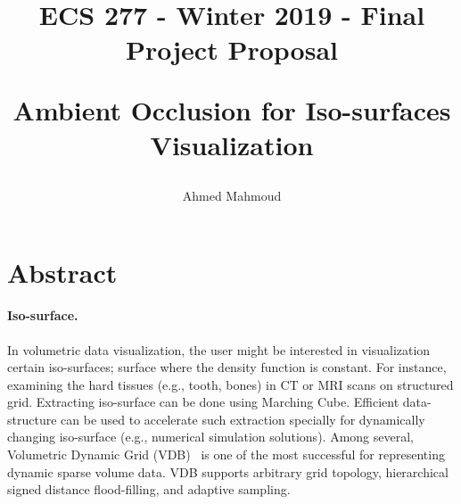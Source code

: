 \documentclass[12pt] {article}
\begin{document}

\title{
\begin{Large}
ECS 277 - Winter 2019 - Final Project Proposal\\\vspace{3.0mm}
\end{Large}
Ambient Occlusion for Iso-surfaces Visualization
}
\author{Ahmed Mahmoud}
\date{}
\maketitle



\section*{Abstract}
\paragraph{Iso-surface.} In volumetric data visualization, the user might be interested in visualization certain iso-surfaces; surface where the density function is constant. For instance, examining the hard tissues (e.g., tooth, bones) in CT or MRI scans on structured grid. Extracting iso-surface can be done using Marching Cube. Efficient data-structure can be used to accelerate such extraction specially for dynamically changing iso-surface (e.g., numerical simulation solutions). Among several, Volumetric Dynamic Grid (VDB)~\citep{museth2013vdb} is one of the most successful for representing dynamic sparse volume data. VDB supports arbitrary grid topology, hierarchical signed distance flood-filling, and adaptive sampling.
\end{document}
